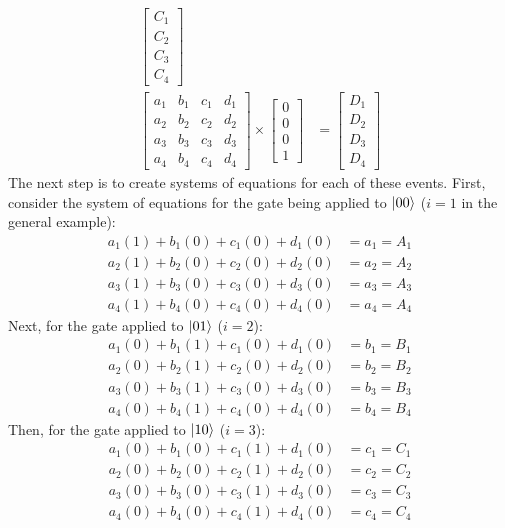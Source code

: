 \documentclass{article}
\begin{document}
\begin{align*}
	\begin{bmatrix}
		C_{1} \\
		C_{2} \\
		C_{3} \\
		C_{4}
	\end{bmatrix} \\
	\begin{bmatrix}
		a_{1} & b_{1} & c_{1} & d_{1} \\
		a_{2} & b_{2} & c_{2} & d_{2} \\
		a_{3} & b_{3} & c_{3} & d_{3} \\
		a_{4} & b_{4} & c_{4} & d_{4}
	\end{bmatrix}
	\times
	\begin{bmatrix}
		0 \\
		0 \\
		0 \\
		1
	\end{bmatrix}
	&=
	\begin{bmatrix}
		D_{1} \\
		D_{2} \\
		D_{3} \\
		D_{4}
	\end{bmatrix}
\end{align*}
The next step is to create systems of equations for each of these events. 
First, consider the system of equations for the gate being applied to $\ket{00}$ ($i = 1$ in the general example):
\begin{align*}
	a_{1}(1) + b_{1}(0) + c_{1}(0) + d_{1}(0) &= a_{1} = A_{1} \\
	a_{2}(1) + b_{2}(0) + c_{2}(0) + d_{2}(0) &= a_{2} = A_{2} \\
	a_{3}(1) + b_{3}(0) + c_{3}(0) + d_{3}(0) &= a_{3} = A_{3} \\
	a_{4}(1) + b_{4}(0) + c_{4}(0) + d_{4}(0) &= a_{4} = A_{4}
\end{align*}
Next, for the gate applied to $\ket{01}$ ($i = 2$):
\begin{align*}
	a_{1}(0) + b_{1}(1) + c_{1}(0) + d_{1}(0) &= b_{1} = B_{1} \\
	a_{2}(0) + b_{2}(1) + c_{2}(0) + d_{2}(0) &= b_{2} = B_{2} \\
	a_{3}(0) + b_{3}(1) + c_{3}(0) + d_{3}(0) &= b_{3} = B_{3} \\
	a_{4}(0) + b_{4}(1) + c_{4}(0) + d_{4}(0) &= b_{4} = B_{4}
\end{align*}
Then, for the gate applied to $\ket{10}$ ($i = 3$):
\begin{align*}
	a_{1}(0) + b_{1}(0) + c_{1}(1) + d_{1}(0) &= c_{1} = C_{1} \\
	a_{2}(0) + b_{2}(0) + c_{2}(1) + d_{2}(0) &= c_{2} = C_{2} \\
	a_{3}(0) + b_{3}(0) + c_{3}(1) + d_{3}(0) &= c_{3} = C_{3} \\
	a_{4}(0) + b_{4}(0) + c_{4}(1) + d_{4}(0) &= c_{4} = C_{4}
\end{align*}
\end{document}

